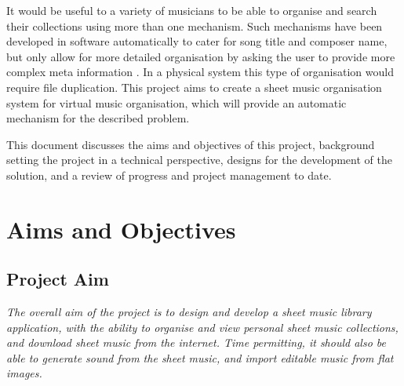 It would be useful to a variety of musicians to be able to organise and search their collections using more than one mechanism. Such mechanisms have been developed in software automatically to cater for song title and composer name, but only allow for more detailed organisation by asking the user to provide more complex meta information \parencite{calypso}. In a physical system this type of organisation would require file duplication. This project aims to create a sheet music organisation system for virtual music organisation, which will provide an automatic mechanism for the described problem.

This document discusses the aims and objectives of this project, background setting the project in a technical perspective, designs for the development of the solution, and a review of progress and project management to date. 
\pagebreak
\section{Aims and Objectives}
\subsection{Project Aim}
\begin{center}
\textit{The overall aim of the project is to design and develop a sheet music library application, with the ability to organise and view personal sheet music collections, and download sheet music from the internet. Time permitting, it should also be able to generate sound from the sheet music, and import editable music from flat images.}
\end{center}
